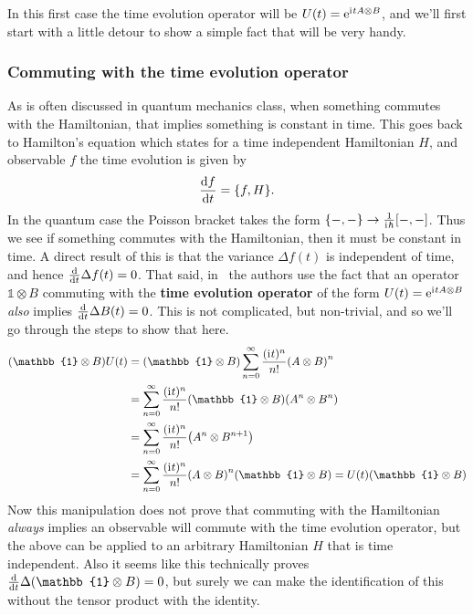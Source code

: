 \documentclass[11pt,english]{article}
\theoremstyle{definition}
\newcommand{\iu}{\mathrm{i}\mkern1mu}
\newcommand{\e}{\mathrm{e}}
\begin{document}
In this first case the time evolution operator will be $U(t) = \e^{\iu tA\otimes B}$, and we'll first start with a little detour to show a simple fact that will be very handy.

\subsubsection{Commuting with the time evolution operator}\label{sec:commuting-with-time}
As is often discussed in quantum mechanics class, when something commutes with the Hamiltonian, that implies something is constant in time. This goes back to Hamilton's equation which states for a time independent Hamiltonian $H$, and observable $f$ the time evolution is given by
\begin{equation*}
	\dv{f}{t} = \pb{f}{H}.
\end{equation*}
In the quantum case the Poisson bracket takes the form $\pb{-}{-}\to\frac{1}{\iu\hbar}\comm{-}{-}$. Thus we see if something commutes with the Hamiltonian, then it must be constant in time. A direct result of this is that the variance $\Delta f(t)$ is independent of time, and hence $\dv{t}\Delta f(t) = 0$. That said, in~\cite{dynamic-entropies} the authors use the fact that an operator $\mathbb{1}\otimes B$ commuting with the \textbf{time evolution operator} of the form $U(t) = \e^{\iu t A\otimes B}$ \emph{also} implies $\dv{t}\Delta B(t) = 0$. This is not complicated, but non-trivial, and so we'll go through the steps to show that here.
\begin{align*}
	\qty(\mathbb{1}\otimes B)U(t) & = \qty(\mathbb{1}\otimes B)\sum_{n = 0}^\infty\frac{(\iu t)^n}{n!}\qty(A\otimes B)^n                                  \\
	                              & = \sum_{n = 0}^\infty\frac{(\iu t)^n}{n!}\qty(\mathbb{1}\otimes B)\qty(A^n\otimes B^n)                                \\
	                              & = \sum_{n = 0}^\infty\frac{(\iu t)^n}{n!}\qty(A^n\otimes B^{n+1})                                                     \\
	                              & = \sum_{n = 0}^\infty\frac{(\iu t)^n}{n!}\qty(A\otimes B)^n\qty(\mathbb{1}\otimes B)  = U(t)\qty(\mathbb{1}\otimes B)
\end{align*}
Now this manipulation does not prove that commuting with the Hamiltonian \emph{always} implies an observable will commute with the time evolution operator, but the above can be applied to an arbitrary Hamiltonian $H$ that is time independent. Also it seems like this technically proves $\dv{t}\Delta(\mathbb{1}\otimes B) = 0$, but surely we can make the identification of this without the tensor product with the identity.
\end{document}
